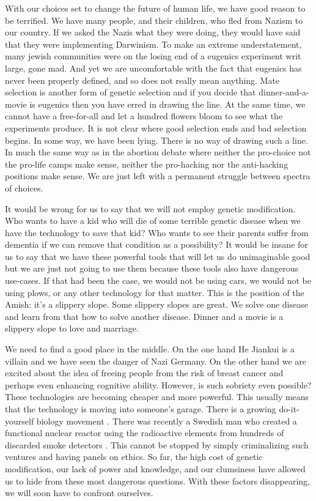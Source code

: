 With our choices set to change the future of human life, we have good reason to be terrified.
We have many people, and their children, who fled from Nazism to our country.
If we asked the Nazis what they were doing, they would have said that they were implementing Darwinism.
To make an extreme understatement, many jewish communities were on the losing end of a eugenics experiment writ large, gone mad.
And yet we are uncomfortable with the fact that eugenics has never been properly defined, and so does not really mean anything.
Mate selection is another form of genetic selection and if you decide that dinner-and-a-movie is eugenics then you have erred in drawing the line.
At the same time, we cannot have a free-for-all and let a hundred flowers bloom to see what the experiments produce.
It is not clear where good selection ends and bad selection begins.
In some way, we have been lying.
There is no way of drawing such a line.
In much the same way as in the abortion debate where neither the pro-choice not the pro-life camps make sense, neither the pro-hacking nor the anti-hacking positions make sense.
We are just left with a permanent struggle between spectra of choices.

It would be wrong for us to say that we will not employ genetic modification.
Who wants to have a kid who will die of some terrible genetic disease when we have the technology to save that kid?
Who wants to see their parents suffer from dementia if we can remove that condition as a possibility?
It would be insane for us to say that we have these powerful tools that will let us do unimaginable good but we are just not going to use them because these tools also have dangerous use-cases.
If that had been the case, we would not be using cars, we would not be using plows, or any other technology for that matter.
This is the position of the Amish: it's a slippery slope.
Some slippery slopes are great.
We solve one disease and learn from that how to solve another disease.
Dinner and a movie is a slippery slope to love and marriage.

We need to find a good place in the middle.
On the one hand He Jiankui is a villain and we have seen the danger of Nazi Germany.
On the other hand we are excited about the idea of freeing people from the risk of breast cancer and perhaps even enhancing cognitive ability.
However, is such sobriety even possible?
These technologies are becoming cheaper and more powerful.
This usually means that the technology is moving into someone's garage.
There is a growing do-it-yourself biology movement \cite{Kolodziejczyk2017}.
There was recently a Swedish man who created a functional nuclear reactor using the radioactive elements from hundreds of discarded smoke detectors \cite{Taylor2011}.
This cannot be stopped by simply criminalizing such ventures and having panels on ethics.
So far, the high cost of genetic modification, our lack of power and knowledge, and our clumsiness have allowed us to hide from these most dangerous questions.
With these factors disappearing, we will soon have to confront ourselves.

